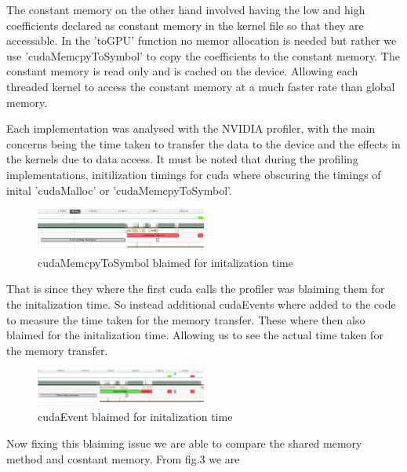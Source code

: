 \documentclass[journal,11pt]{IEEEtran}
\begin{document}
The constant memory on the other hand involved having the low and high coefficients declared as constant memory in the kernel file so that they are accessable. In the 'toGPU' function no memor allocation is needed but rather we use 'cudaMemcpyToSymbol' to copy the coefficients to the constant memory. The constant memory is read only and is cached on the device. Allowing each threaded kernel to access the constant memory at a much faster rate than global memory.

Each implementation was analysed with the NVIDIA profiler, with the main concerns being the time taken to transfer the data to the device and the effects in the kernels due to data access. It must be noted that during the profiling implementations, initilization timings for cuda where obscuring the timings of inital 'cudaMalloc' or 'cudaMemcpyToSymbol'. 

\begin{figure}[h]
    \centering
    \includegraphics[width=0.5\textwidth]{assets/blaimed-mem.png}
    \caption{cudaMemcpyToSymbol blaimed for initalization time}
    \label{fig:2}
\end{figure}

That is since they where the first cuda calls the profiler was blaiming them for the initalization time. So instead additional cudaEvents where added to the code to measure the time taken for the memory transfer. These where then also blaimed for the initalization time. Allowing us to see the actual time taken for the memory transfer.


\begin{figure}[h]
    \centering
    \includegraphics[width=0.5\textwidth]{assets/blaimed-event.png}
    \caption{cudaEvent blaimed for initalization time}
    \label{fig:3}
\end{figure}

Now fixing this blaiming issue we are able to compare the shared memory method and cosntant memory. From fig.3 we are

\begin{figure}
    
\end{figure}
\end{document}

